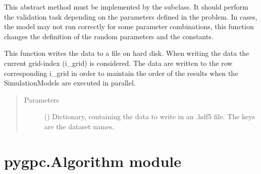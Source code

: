 \documentclass[letterpaper,10pt,english,openany,oneside]{sphinxmanual}
\begin{document}
\begin{fulllineitems}
\begin{fulllineitems}
\begin{quote}
\begin{description}
\end{description}\end{quote}

\end{fulllineitems}


\begin{fulllineitems}
\label{\detokenize{pygpc:pygpc.AbstractModel.AbstractModel.validate}}
This abstract method must be implemented by the subclass.
It should perform the validation task depending on the parameters defined in the problem.
In cases, the model may not run correctly for some parameter combinations, this function changes the definition
of the random parameters and the constants.

\end{fulllineitems}


\begin{fulllineitems}
\label{\detokenize{pygpc:pygpc.AbstractModel.AbstractModel.write_results}}
This function writes the data to a file on hard disk.
When writing the data the current grid-index (i\_grid) is considered.
The data are written to the row corresponding i\_grid in order to
maintain the order of the results when the SimulationModels are
executed in parallel.
\begin{quote}\begin{description}
\item[{Parameters}] \leavevmode
{} () \textendash{} Dictionary, containing the data to write in an .hdf5 file. The keys are the dataset names.

\end{description}\end{quote}

\end{fulllineitems}


\end{fulllineitems}



\section{pygpc.Algorithm module}
\label{\detokenize{pygpc:module-pygpc.Algorithm}}\label{\detokenize{pygpc:pygpc-algorithm-module}}
\end{document}
